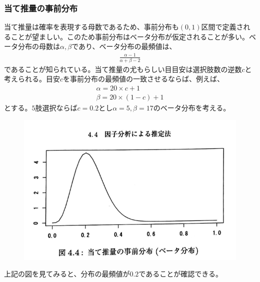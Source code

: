 \documentclass[12pt]{jarticle}
\begin{document}
\subsubsection{当て推量の事前分布}
当て推量は確率を表現する母数であるため、事前分布も$(0,1)$区間で定義されることが望ましい。このため事前分布はベータ分布が仮定されることが多い。ベータ分布の母数は$\alpha,\beta$であり、ベータ分布の最頻値は、
\begin{align}
  \label{06}
  \displaystyle
  \frac{\alpha - 1}{\alpha + \beta- 2}
  \tag{4.35}
\end{align}
であることが知られている。当て推量の尤もらしい目目安は選択肢数の逆数$c$と考えられる。目安$c$を事前分布の最頻値の一致させるならば、例えば、
\begin{align}
  \label{07}
  \displaystyle
  \alpha = 20 \times c + 1\\
  \beta = 20 \times (1 - c) + 1
  \tag{4.36}
\end{align}
とする。$5$肢選択ならば$c = 0.2$とし$\alpha = 5,\beta = 17$のベータ分布を考える。
\begin{center}
  \begin{figure}[H]
    \includegraphics[bb = -500 300 1 1,scale = 0.3]{ベータ分布.png}
  \end{figure}
  \end{center}
\vspace{2cm}
上記の図を見てみると、分布の最頻値が$0.2$であることが確認できる。
\end{document}
